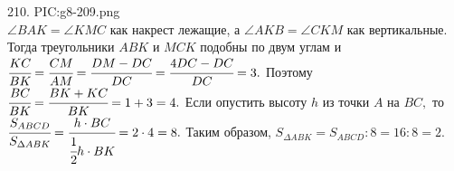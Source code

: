 210. {{PIC:g8-209.png}}\\
$\angle BAK=\angle KMC$ как накрест лежащие, а $\angle AKB=\angle CKM$ как вертикальные. Тогда треугольники $ABK$ и $MCK$ подобны по двум углам и $\cfrac{KC}{BK}=\cfrac{CM}{AM}=\cfrac{DM-DC}{DC}=\cfrac{4DC-DC}{DC}=3.$ Поэтому $\cfrac{BC}{BK}=\cfrac{BK+KC}{BK}=1+3=4.$ Если опустить высоту $h$ из точки $A$ на $BC,$ то $\cfrac{S_{ABCD}}{S_{\Delta ABK}}=\cfrac{h\cdot BC}{\cfrac{1}{2}h\cdot BK}=2\cdot4=8.$ Таким образом, $S_{\Delta ABK}=S_{ABCD}:8=16:8=2.$\\
